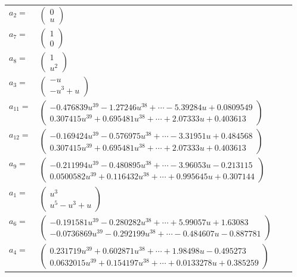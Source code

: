 \documentclass[1p]{elsarticle_modified}
\theoremstyle{definition}
\begin{document}
\begin{tabular}{m{7pt} m{180pt} m{7pt} m{180pt} }
\flushright $a_{2}=$&$\begin{pmatrix}0\\u\end{pmatrix}$ \\
\flushright $a_{7}=$&$\begin{pmatrix}1\\0\end{pmatrix}$ \\
\flushright $a_{8}=$&$\begin{pmatrix}1\\u^2\end{pmatrix}$ \\
\flushright $a_{3}=$&$\begin{pmatrix}- u\\- u^3+u\end{pmatrix}$ \\
\flushright $a_{11}=$&$\begin{pmatrix}-0.476839 u^{39}-1.27246 u^{38}+\cdots-5.39284 u+0.0809549\\0.307415 u^{39}+0.695481 u^{38}+\cdots+2.07333 u+0.403613\end{pmatrix}$ \\
\flushright $a_{12}=$&$\begin{pmatrix}-0.169424 u^{39}-0.576975 u^{38}+\cdots-3.31951 u+0.484568\\0.307415 u^{39}+0.695481 u^{38}+\cdots+2.07333 u+0.403613\end{pmatrix}$ \\
\flushright $a_{9}=$&$\begin{pmatrix}-0.211994 u^{39}-0.480895 u^{38}+\cdots-3.96053 u-0.213115\\0.0500582 u^{39}+0.116432 u^{38}+\cdots+0.995645 u+0.307144\end{pmatrix}$ \\
\flushright $a_{1}=$&$\begin{pmatrix}u^3\\u^5- u^3+u\end{pmatrix}$ \\
\flushright $a_{6}=$&$\begin{pmatrix}-0.191581 u^{39}-0.280282 u^{38}+\cdots+5.99057 u+1.63083\\-0.0736869 u^{39}-0.292199 u^{38}+\cdots-0.484607 u-0.887781\end{pmatrix}$ \\
\flushright $a_{4}=$&$\begin{pmatrix}0.231719 u^{39}+0.602871 u^{38}+\cdots+1.98498 u-0.495273\\0.0632015 u^{39}+0.154197 u^{38}+\cdots+0.0133278 u+0.385259\end{pmatrix}$ \\

\end{tabular}
\end{document}
